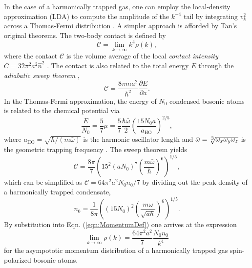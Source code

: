 	In the case of a harmonically trapped gas, one can employ the local-density approximation (LDA) to compute the amplitude of the $k^{-4}$ tail by  integrating $v_k^2$ across a Thomas-Fermi distribution \cite{Chang16}.
	A simpler approach is afforded by Tan's original theorems.
	The two-body contact is defined by \cite{Tan08_momentum,Braaten11}
	\begin{equation}
		\mathcal{C} = \lim_{k\rightarrow\infty}k^4\rho(k),
		\label{eqn:MomentumDef}
	\end{equation}
	where the contact $\mathcal{C}$ is the volume average of the local \emph{contact intensity} $\hat{C} = 32 \pi^2 a^2 \hat{n}^2$ \cite{Werner12_boson}.
	The contact is also related to the total energy $E$ through the \emph{adiabatic sweep theorem} \cite{Tan08_energetics},
	\begin{equation}
		\mathcal{C} = \frac{8\pi m a^2}{\hbar^2}\frac{\partial E}{\partial a}.
	\end{equation}
	In the Thomas-Fermi approximation, the energy of $N_0$ condensed bosonic atoms is related to the chemical potential via
	\begin{equation}
		\frac{E}{N_0} = \frac{5}{7}\mu = \frac{5}{7} \frac{\hbar \bar{\omega}}{2} \left(\frac{15 N_0 a}{a_\textrm{HO}}\right)^{2/5},
		\label{mu}
	\end{equation}
	where $a_\textrm{HO} = \sqrt{\hbar/(m \bar{\omega})}$ is the harmonic oscillator length and $\bar{\omega}=\sqrt[\uproot{2}\scriptstyle 3]{\omega_x \omega_y \omega_z}$ is the geometric trapping frequency \cite{PitaevskiiStringari,PethickSmith}.
	The sweep theorem yields
	\begin{equation}
		\mathcal{C} = \frac{8\pi}{7} \left(15^{2}(a N_0)^{7} \left(\frac{m \bar{\omega}}{\hbar}\right)^{6}\right)^{1/5},
		\label{eqn:TotalHarmonicContact}
	\end{equation}
	which can be simplified as $\mathcal{C} = 64\pi^2a^2 N_0 n_0/7$ by dividing out the peak density of a harmonically trapped condensate,
	\begin{equation}
		n_0 = \frac{1}{8 \pi}\left( (15N_0)^2 \left(\frac{m \bar{\omega}}{\sqrt{a \hbar}}\right)	 ^{6}\right)^{1/5}.
		\label{eqn:n0}
	\end{equation}
	By substitution into Eqn.
	(\ref{eqn:MomentumDef}) one arrives at the expression
	\begin{equation}
		\lim_{k\rightarrow\infty}\rho(k) = \frac{64\pi^2a^2}{7} \frac{N_0n_0}{k^4}
		\label{eqn:pred_scaling}
	\end{equation}
	for the asympototic momentum distribution of a harmonically trapped gas spin-polarized bosonic atoms.
	


